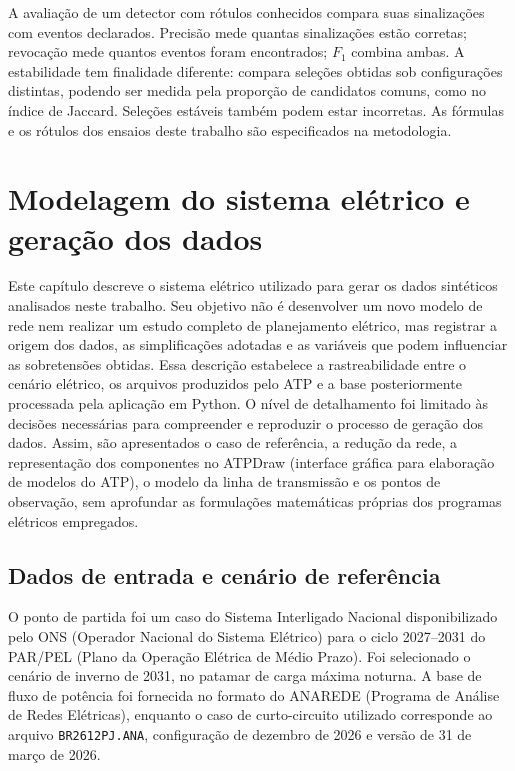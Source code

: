 \documentclass[
	12pt,				%
	openright,			%
	oneside,			%
	a4paper,			%
	chapter=TITLE,		%
	section=TITLE,		%
	subsection=TITLE,	%
	subsubsection=TITLE,%
	english,			%
	brazilian			%
	]{abntex2}
\theoremstyle{definition}
\begin{document}
A avaliação de um detector com rótulos conhecidos compara suas sinalizações
com eventos declarados. Precisão mede quantas sinalizações estão corretas;
revocação mede quantos eventos foram encontrados; $F_1$ combina ambas.
A estabilidade tem finalidade diferente: compara seleções obtidas sob
configurações distintas, podendo ser medida pela proporção de candidatos
comuns, como no índice de Jaccard. Seleções estáveis também podem estar
incorretas. As fórmulas e os rótulos dos ensaios deste trabalho são
especificados na metodologia.

\chapter{Modelagem do sistema elétrico e geração dos dados}

Este capítulo descreve o sistema elétrico utilizado para gerar os dados
sintéticos analisados neste trabalho. Seu objetivo não é desenvolver um novo
modelo de rede nem realizar um estudo completo de planejamento elétrico, mas
registrar a origem dos dados, as simplificações adotadas e as variáveis que
podem influenciar as sobretensões obtidas. Essa descrição estabelece a
rastreabilidade entre o cenário elétrico, os arquivos produzidos pelo ATP e a
base posteriormente processada pela aplicação em Python. O nível de detalhamento foi limitado às decisões necessárias para compreender e reproduzir o processo de geração dos dados. Assim, são apresentados o caso de referência, a redução da rede, a representação dos componentes no ATPDraw (interface gráfica para elaboração de modelos do ATP),
o modelo da linha de transmissão e os pontos de observação, sem aprofundar as
formulações matemáticas próprias dos programas elétricos empregados.

\section{Dados de entrada e cenário de referência}

O ponto de partida foi um caso do Sistema Interligado Nacional disponibilizado
pelo ONS (Operador Nacional do Sistema Elétrico) para o ciclo 2027--2031
do PAR/PEL (Plano da Operação Elétrica de Médio Prazo). Foi selecionado o cenário de inverno de 2031, no patamar de carga
máxima noturna. A base de fluxo de potência foi fornecida no formato do
ANAREDE (Programa de Análise de Redes Elétricas), enquanto o caso de curto-circuito utilizado corresponde ao arquivo
\texttt{BR2612PJ.ANA}, configuração de dezembro de 2026 e versão de 31 de
março de 2026.
\end{document}
